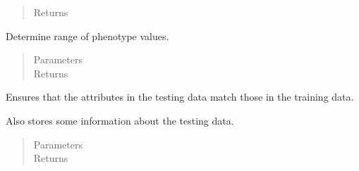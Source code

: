 \documentclass[letterpaper,10pt,english]{sphinxmanual}
\begin{document}
\begin{fulllineitems}
\begin{fulllineitems}
\begin{quote}
\begin{description}
\item[{Returns}] \leavevmode


\end{description}\end{quote}

\end{fulllineitems}


\begin{fulllineitems}
\label{\detokenize{eLCS:eLCS.DataManagement.DataManagement.characterizePhenotype}}
Determine range of phenotype values.
\begin{quote}\begin{description}
\item[{Parameters}] \leavevmode
{} \textendash{} 

\item[{Returns}] \leavevmode


\end{description}\end{quote}

\end{fulllineitems}


\begin{fulllineitems}
\label{\detokenize{eLCS:eLCS.DataManagement.DataManagement.compareDataset}}
Ensures that the attributes in the testing data match those in the training data.

Also stores some information about the testing data.
\begin{quote}\begin{description}
\item[{Parameters}] \leavevmode
{} \textendash{} 

\item[{Returns}] \leavevmode


\end{description}\end{quote}

\end{fulllineitems}



\end{fulllineitems}
\end{document}
